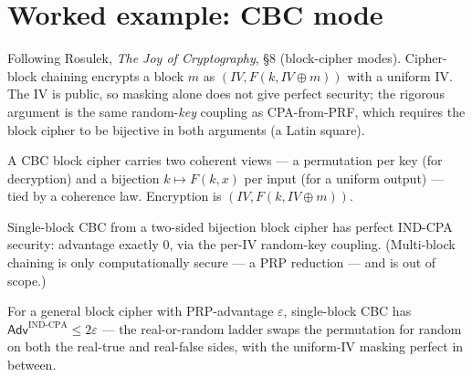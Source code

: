 \chapter{Worked example: CBC mode}

Following Rosulek, \emph{The Joy of Cryptography}, §8 (block-cipher modes).
Cipher-block chaining encrypts a block $m$ as $(\mathit{IV}, F(k, \mathit{IV}
\oplus m))$ with a uniform IV. The IV is public, so masking alone does not give
perfect security; the rigorous argument is the same random-\emph{key} coupling as
CPA-from-PRF, which requires the block cipher to be bijective in both arguments (a
Latin square).

\begin{definition}
  \label{def:cbc}
  \leanok
  A CBC block cipher carries two coherent views --- a permutation per key (for
  decryption) and a bijection $k \mapsto F(k, x)$ per input (for a uniform output)
  --- tied by a coherence law. Encryption is $(\mathit{IV}, F(k, \mathit{IV}
  \oplus m))$.
\end{definition}

\begin{theorem}
  \label{thm:cbc-perfect}
  \leanok
  Single-block CBC from a two-sided bijection block cipher has perfect IND-CPA
  security: advantage exactly $0$, via the per-IV random-key coupling. (Multi-block
  chaining is only computationally secure --- a PRP reduction --- and is out of
  scope.)
\end{theorem}

\begin{theorem}
  \label{thm:cbc-bound}
  \leanok
  For a general block cipher with PRP-advantage $\varepsilon$, single-block CBC has
  $\mathsf{Adv}^{\mathrm{IND\text{-}CPA}} \le 2\varepsilon$ --- the real-or-random
  ladder swaps the permutation for random on both the real-true and real-false
  sides, with the uniform-IV masking perfect in between.
\end{theorem}
